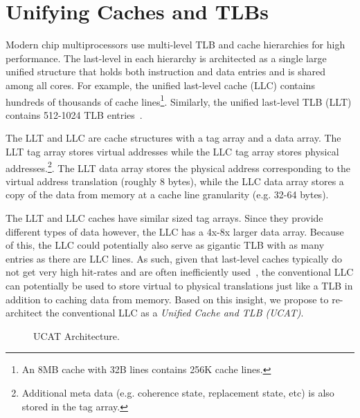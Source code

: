 \section{Unifying Caches and TLBs}
\label{sec:UCAT}

\noindent Modern chip multiprocessors use multi-level TLB and cache
hierarchies for high performance. The last-level in each hierarchy is
architected as a single large unified structure that holds both
instruction and data entries and is shared among all cores. For
example, the unified last-level cache (LLC) contains hundreds of
thousands of cache lines\footnote{An 8MB cache with 32B lines contains
256K cache lines.}. Similarly, the unified last-level TLB (LLT)
contains 512-1024 TLB entries~\cite{}.


The LLT and LLC are cache structures with a tag array and a data
array. The LLT tag array stores virtual addresses while the LLC tag
array stores physical addresses.\footnote{Additional meta data (e.g.
coherence state, replacement state, etc) is also stored in the tag
array.}. The LLT data array stores the physical address corresponding
to the virtual address translation (roughly 8 bytes), while the LLC
data array stores a copy of the data from memory at a cache line
granularity (e.g. 32-64 bytes).

The LLT and LLC caches have similar sized tag arrays. Since they
provide different types of data however, the LLC has a 4x-8x larger
data array. Because of this, the LLC could potentially also serve as
gigantic TLB with as many entries as there are LLC lines.
As such, given that last-level caches typically do not get very high
hit-rates and are often inefficiently used~\cite{}, the conventional
LLC can potentially be used to store virtual to physical translations
just like a TLB in addition to caching data from memory. Based on this
insight, we propose to re-architect the conventional LLC as a {\em
Unified Cache and TLB (UCAT)}.

\begin{figure*}[tbh] 
\vspace{-0. in}
\centering
\centerline{}
\caption{\small UCAT Architecture. \normalsize}
\label{fig:UCAT} 
\vspace{-0.0in}
\end{figure*}

